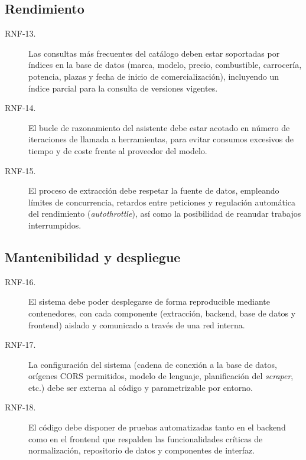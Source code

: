 \subsection{Rendimiento}

\begin{description}
  \item[RNF-13.] Las consultas más frecuentes del catálogo deben estar
        soportadas por índices en la base de datos (marca, modelo, precio,
        combustible, carrocería, potencia, plazas y fecha de inicio de
        comercialización), incluyendo un índice parcial para la consulta de
        versiones vigentes.

  \item[RNF-14.] El bucle de razonamiento del asistente debe estar acotado en
        número de iteraciones de llamada a herramientas, para evitar consumos
        excesivos de tiempo y de coste frente al proveedor del modelo.

  \item[RNF-15.] El proceso de extracción debe respetar la fuente de datos,
        empleando límites de concurrencia, retardos entre peticiones y
        regulación automática del rendimiento (\emph{autothrottle}), así como
        la posibilidad de reanudar trabajos interrumpidos.
\end{description}

\subsection{Mantenibilidad y despliegue}

\begin{description}
  \item[RNF-16.] El sistema debe poder desplegarse de forma reproducible
        mediante contenedores, con cada componente (extracción, backend, base
        de datos y frontend) aislado y comunicado a través de una red interna.

  \item[RNF-17.] La configuración del sistema (cadena de conexión a la base de
        datos, orígenes CORS permitidos, modelo de lenguaje, planificación del
        \emph{scraper}, etc.) debe ser externa al código y parametrizable por
        entorno.

  \item[RNF-18.] El código debe disponer de pruebas automatizadas tanto en el
        backend como en el frontend que respalden las funcionalidades críticas
        de normalización, repositorio de datos y componentes de interfaz.
\end{description}

